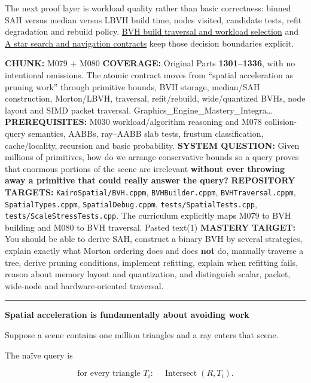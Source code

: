 The next proof layer is workload quality rather than basic correctness: binned SAH versus median versus LBVH build time, nodes visited, candidate tests, refit degradation and rebuild policy. \hyperref[appendix-5653a7aea6bb]{BVH build traversal and workload selection} and \hyperref[appendix-5803241aa1a5]{A star search and navigation contracts} keep those decision boundaries explicit.

\textbf{CHUNK:} M079 + M080 \textbf{COVERAGE:} Original Parts \textbf{1301--1336}, with no intentional omissions. The atomic contract moves from ``spatial acceleration as pruning work'' through primitive bounds, BVH storage, median/SAH construction, Morton/LBVH, traversal, refit/rebuild, wide/quantized BVHs, node layout and SIMD packet traversal. Graphics\_Engine\_Mastery\_Integra\ldots{} \textbf{PREREQUISITES:} M030 workload/algorithm reasoning and M078 collision-query semantics, AABBs, ray--AABB slab tests, frustum classification, cache/locality, recursion and basic probability. \textbf{SYSTEM QUESTION:} Given millions of primitives, how do we arrange conservative bounds so a query proves that enormous portions of the scene are irrelevant \textbf{without ever throwing away a primitive that could really answer the query?} \textbf{REPOSITORY TARGETS:} \texttt{KairoSpatial/BVH.cppm}, \texttt{BVHBuilder.cppm}, \texttt{BVHTraversal.cppm}, \texttt{SpatialTypes.cppm}, \texttt{SpatialDebug.cppm}, \texttt{tests/SpatialTests.cpp}, \texttt{tests/ScaleStressTests.cpp}. The curriculum explicitly maps M079 to BVH building and M080 to BVH traversal. Pasted text(1) \textbf{MASTERY TARGET:} You should be able to derive SAH, construct a binary BVH by several strategies, explain exactly what Morton ordering does and does \textbf{not} do, manually traverse a tree, derive pruning conditions, implement refitting, explain when refitting fails, reason about memory layout and quantization, and distinguish scalar, packet, wide-node and hardware-oriented traversal.

\begin{center}\rule{0.5\linewidth}{0.5pt}\end{center}

\textbf{Spatial acceleration is fundamentally about avoiding work}

Suppose a scene contains one million triangles and a ray enters that scene.

The naïve query is

\[
\text{for every triangle }T_i:\quad
\operatorname{Intersect}(R,T_i).
\]

